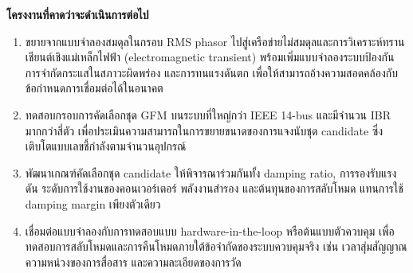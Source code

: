 \documentclass[12pt,a4paper]{article}
\newcommand{\templateheading}[1]{%
  \vspace{0.45em}\noindent\colorbox{academicblue}{\parbox{\dimexpr\textwidth-2\fboxsep\relax}{\color{white}\fontsize{20}{22}\selectfont\bfseries #1}}\par\vspace{0.28em}}
\begin{document}
\templateheading{โครงงานที่คาดว่าจะดำเนินการต่อไป}
\begin{enumerate}
\item ขยายจากแบบจำลองสมดุลในกรอบ RMS phasor ไปสู่เครือข่ายไม่สมดุลและการวิเคราะห์ทรานเชียนต์เชิงแม่เหล็กไฟฟ้า (electromagnetic transient) พร้อมเพิ่มแบบจำลองระบบป้องกัน การจำกัดกระแสในสภาวะผิดพร่อง และการทนแรงดันตก เพื่อให้สามารถอ้างความสอดคล้องกับข้อกำหนดการเชื่อมต่อได้ในอนาคต
\item ทดสอบกรอบการคัดเลือกชุด GFM บนระบบที่ใหญ่กว่า IEEE 14-bus และมีจำนวน IBR มากกว่าสี่ตัว เพื่อประเมินความสามารถในการขยายขนาดของการแจงนับชุด candidate ซึ่งเติบโตแบบเลขชี้กำลังตามจำนวนอุปกรณ์
\item พัฒนาเกณฑ์คัดเลือกชุด candidate ให้พิจารณาร่วมกันทั้ง damping ratio, การรองรับแรงดัน ระดับการใช้งานของคอนเวอร์เตอร์ พลังงานสำรอง และต้นทุนของการสลับโหมด แทนการใช้ damping margin เพียงตัวเดียว
\item เชื่อมต่อแบบจำลองกับการทดสอบแบบ hardware-in-the-loop หรือต้นแบบตัวควบคุม เพื่อทดสอบการสลับโหมดและการคืนโหมดภายใต้ข้อจำกัดของระบบควบคุมจริง เช่น เวลาสุ่มสัญญาณ ความหน่วงของการสื่อสาร และความละเอียดของการวัด
\end{enumerate}
\end{document}

